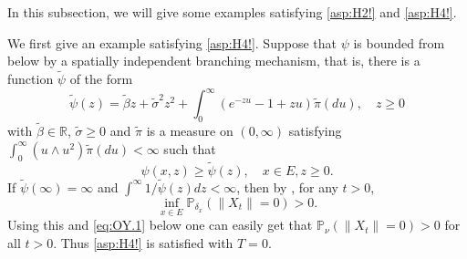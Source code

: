 \documentclass[12pt,a4paper]{amsart}
\numberwithin{equation}{section}
\theoremstyle{plain}
\theoremstyle{definition}
\theoremstyle{remark}
\begin{document}
	In this subsection, we will give some examples satisfying \eqref{asp:H2!} and \eqref{asp:H4!}.

	We first give an example satisfying \eqref{asp:H4!}.
	Suppose that $\psi$ is bounded from below by a spatially independent branching mechanism, that is, there is a function $\widetilde\psi$ of the form
\[
	\widetilde\psi(z)
	=\widetilde\beta z+\widetilde\sigma^2z^2+\int^\infty_0(e^{-zu}-1+zu)\widetilde\pi(du), \quad z\ge 0
\]
    with $\widetilde\beta\in \mathbb{R}$, $\widetilde\sigma\ge 0$ and $\widetilde\pi$ is a measure
    on $(0, \infty)$ satisfying $\int^\infty_0(u\wedge u^2)\widetilde\pi(du)<\infty$ such that
\[
	\psi(x, z)\ge \widetilde\psi(z), \quad x\in E, z\ge 0.
\]
    If $\widetilde\psi(\infty)=\infty$ and $\int^\infty1/\widetilde\psi(z)dz<\infty$, then by
    \cite[Lemma 2.3]{RenSongZhang2015Limit}, for any $t>0$,
\[
		   \inf_{x\in E}\mathbb P_{\delta_x}(\|X_t\| = 0)>0.
\]
     Using this and \eqref{eq:OY.1} below one can easily get that
     $\mathbb P_\nu(\|X_t\| = 0)>0$ for all $t>0$. Thus \eqref{asp:H4!} is satisfied with $T=0$.
\end{document}
